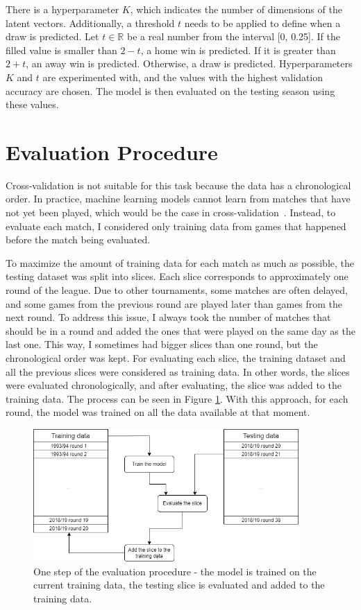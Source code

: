 \documentclass[thesis=M,english]{FITthesis}[2019/12/23]
\begin{document}
There is a hyperparameter $K$, which indicates the number of dimensions of the latent vectors. Additionally, a threshold $t$ needs to be applied to define when a draw is predicted. Let $t \in \mathbb{R}$ be a real number from the interval [0, 0.25]. If the filled value is smaller than $2 - t$, a home win is predicted. If it is greater than $2 + t$, an away win is predicted. Otherwise, a draw is predicted. Hyperparameters $K$ and $t$ are experimented with, and the values with the highest validation accuracy are chosen. The model is then evaluated on the testing season using these values.

\section{Evaluation Procedure}
\label{eval_proc}
Cross-validation is not suitable for this task because the data has a chronological order. In practice, machine learning models cannot learn from matches that have not yet been played, which would be the case in cross-validation~\cite{Dutch_football}. Instead, to evaluate each match, I considered only training data from games that happened before the match being evaluated.

To maximize the amount of training data for each match as much as possible, the testing dataset was split into slices. Each slice corresponds to approximately one round of the league. Due to other tournaments, some matches are often delayed, and some games from the previous round are played later than games from the next round. To address this issue, I always took the number of matches that should be in a round and added the ones that were played on the same day as the last one. This way, I sometimes had bigger slices than one round, but the chronological order was kept. For evaluating each slice, the training dataset and all the previous slices were considered as training data. In other words, the slices were evaluated chronologically, and after evaluating, the slice was added to the training data. The process can be seen in Figure \ref{fig:eval}. With this approach, for each round, the model was trained on all the data available at that moment.
\begin{figure}[h]
    \centering
    \includegraphics[width=0.9\textwidth]{figures/eval.png}
    \caption{One step of the evaluation procedure - the model is trained on the current training data, the testing slice is evaluated and added to the training data.}
    \label{fig:eval}
\end{figure}
\end{document}
